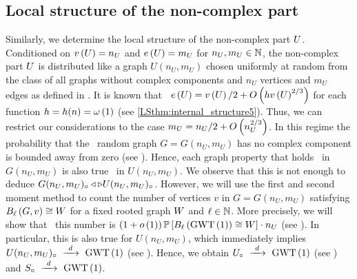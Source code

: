 \subsection{Local structure of the non-complex part}\label{LSsub:strategy_non_complex}
Similarly, we determine the local structure of the non-complex part $U$. Conditioned on $v\left({U}\right)=n_U$ and $e\left({U}\right)=m_U$ for $n_U, m_U \in\mathbb{N}$, the non-complex part $U$ is distributed like a graph $U(n_U,m_U)$ chosen uniformly at random from the class of all graphs without complex components and $n_U$ vertices and $m_U$ edges as defined in . It is known that \whp\ $e\left({U}\right)=v\left({U}\right)/2+O\left(hv\left({U}\right)^{2/3}\right)$ for each function $h=h(n)=\omega\left(1\right)$ (see \ref{LSthm:internal_structure5}). Thus, we can restrict our considerations to the case $m_U=n_U/2+O\left(n_U^{2/3}\right)$. In this regime the probability that the \ER\ random graph $G=G(n_U,m_U)$ has no complex component is bounded away from zero (see ). Hence, each graph property that holds \whp\ in $G(n_U,m_U)$ is also true \whp\ in $U(n_U,m_U)$. We observe that this is not enough to deduce $G(n_U,m_U)_\circ \triangleleft \triangleright U(n_U,m_U)_\circ$. However, we will use the first and second moment method to count the number of vertices $v$ in $G=G(n_U,m_U)$ satisfying $B_{\ell}\left(G, v\right)\cong W$ for a fixed rooted graph $W$ and $\ell\in\mathbb{N}$. More precisely, we will show that \whp\ this number is $\left(1+o\left(1\right)\right)\mathbb{P}\left[B_{\ell}\left(\operatorname{GWT}\left(1\right)\right)\cong W\right]\cdot n_U$ (see ). In particular, this is also true for $U(n_U,m_U)$, which immediately implies $U(n_U,m_U)_\circ~\xrightarrow{~d~}~\operatorname{GWT}\left(1\right)$ (see ). Hence, we obtain $U_\circ~\xrightarrow{~d~}~\operatorname{GWT}\left(1\right)$ (see ) and $S_\circ~\xrightarrow{~d~}~\operatorname{GWT}\left(1\right)$.



